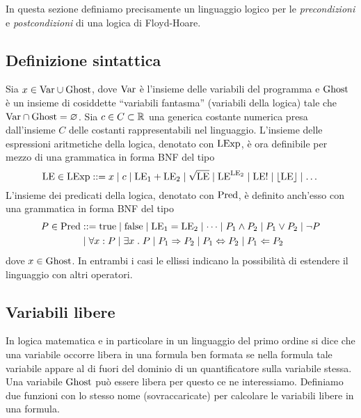 In questa sezione definiamo precisamente un linguaggio logico per le
\emph{precondizioni} e \emph{postcondizioni} di una logica di Floyd-Hoare.

\subsection{Definizione sintattica}

Sia $x \in \mathrm{Var} \cup \mathrm{Ghost}$, dove $\mathrm{Var}$ è l'insieme delle variabili del
programma e $\mathrm{Ghost}$ è un insieme di cosiddette ``variabili fantasma''
(variabili della logica) tale che $\mathrm{Var} \cap \mathrm{Ghost} = \varnothing$.
Sia $c \in C \subset \mathbb{R}$ una generica costante numerica presa dall'insieme
$C$ delle costanti rappresentabili nel linguaggio.
L'insieme delle espressioni aritmetiche della logica, denotato con $\mathrm{LExp}$,
è ora definibile per mezzo di una grammatica in forma BNF del tipo
\[
  \mathrm{LE} \in \mathrm{LExp} ::= x
                \mathrel{\mid} c
                \mathrel{\mid} \mathrm{LE}_1 + \mathrm{LE}_2
                \mathrel{\mid} \sqrt{\mathrm{LE}}
                \mathrel{\mid} \mathrm{LE}^{\mathrm{LE}_2}
                \mathrel{\mid} \mathrm{LE}!
                \mathrel{\mid} \lfloor \mathrm{LE} \rfloor
                \mathrel{\mid} \dots
\]
L'insieme dei predicati della logica, denotato con $\mathrm{Pred}$, è definito anch'esso con una grammatica in forma BNF del tipo
\begin{align*}
P \in \Pred &::= \true
            \vbar \false
            \vbar\LE_1 = \LE_2
            \vbar \dots
            \vbar P_1 \land P_2
            \vbar P_1 \lor P_2
            \vbar \neg P \\
            &\vbar \forall x \itc P
            \vbar \exists x \st P
            \vbar P_1 \Rightarrow P_2
            \vbar P_1 \Leftrightarrow P_2 \vbar P_1 \Leftarrow P_2
\end{align*}
dove $x \in\mathrm{Ghost}$.
In entrambi i casi le ellissi indicano la possibilità di estendere
il linguaggio con altri operatori.

\subsection{Variabili libere}
In logica matematica e in particolare in un linguaggio del primo ordine si dice che una variabile occorre libera in una formula ben formata se nella formula tale variabile appare al di fuori del dominio di un quantificatore sulla variabile stessa. Una variabile $\mathrm{Ghost}$ può essere libera per questo ce ne interessiamo.
Definiamo due funzioni con lo stesso nome (sovraccaricate) per calcolare le variabili libere in una formula.

